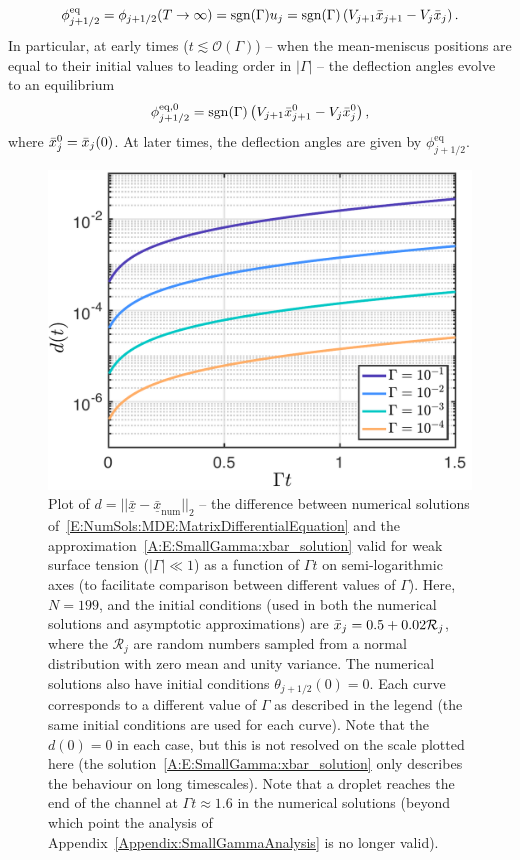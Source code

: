 \begin{subappendices}
\begin{equation}\label{A:E:SmallGamma:FastTimescaleSolution}
\phi_{j+1/2}^{\text{eq}}=\phi_{j+1/2}(T\to \infty)= \mathrm{sgn}(\Gamma) u_j =\mathrm{sgn}(\Gamma) \left( V_{j+1}\bar{x}_{j+1} - V_j \bar{x}_j\right).
\end{equation}
In particular, at early times ($t \lesssim \mathcal{O}(\Gamma)$) -- when the mean-meniscus positions are equal to their initial values to leading order in $|\Gamma|$ -- the deflection angles evolve to an equilibrium
\begin{equation}
\phi_{j+1/2} ^{\text{eq},0} = \mathrm{sgn}(\Gamma) \left( V_{j+1}\bar{x}_{j+1}^0 - V_j \bar{x}_j^0\right),
\end{equation}
where $\bar{x}_j^0 = \bar{x}_j(0)$. At later times, the  deflection angles are given by $\phi^{\text{eq}}_{j+1/2}$.


\begin{figure}[t]
\centering
\includegraphics[scale=0.47]{Small_gamma_comparison_labelled}
\caption{Plot of $d =   ||\underline{\bar{x}}- \underline{\bar{x}}_{\text{num}}||_2$ -- the difference between
numerical solutions of~\eqref{E:NumSols:MDE:MatrixDifferentialEquation} and the approximation~\eqref{A:E:SmallGamma:xbar_solution} valid for weak surface tension ($|\Gamma|\ll 1$) as a function of $\Gamma t$ on semi-logarithmic axes (to facilitate comparison between different values of $\Gamma$). Here, $N = 199$, and the initial conditions (used in both the numerical solutions and asymptotic approximations) are $\bar{x}_j= 0.5 + 0.02 \mathcal{R}_j$, where the $\mathcal{R}_j$ are random numbers sampled from a normal distribution with zero mean and unity variance. The numerical solutions also have initial conditions $\theta_{j+1/2}(0) = 0$. Each curve corresponds to a different value of $\Gamma$ as described in the legend (the same initial conditions are used for each curve). Note that the $d(0) = 0$ in each case, but this is not resolved on the scale plotted here (the solution~\eqref{A:E:SmallGamma:xbar_solution} only describes the behaviour on long timescales). Note that a droplet reaches the end of the channel at $\Gamma t \approx 1.6$ in the numerical solutions (beyond which point the analysis of Appendix~\ref{Appendix:SmallGammaAnalysis} is no longer valid).} \label{fig:Appendix:SmallGamma:ManyChannelAgreement}

\end{figure}
\end{subappendices}

